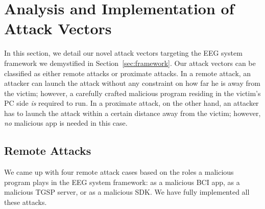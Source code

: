 \section{Analysis and Implementation of Attack Vectors}
\label{sec:attack}

In this section, we detail our novel attack vectors targeting the EEG system framework we demystified in Section~\ref{sec:framework}. Our attack vectors can be classified as either remote attacks or proximate attacks. In a remote attack, an attacker can launch the attack without any constraint on how far he is away from the victim; however, a carefully crafted malicious program residing in the victim's PC side \emph{is} required to run. In a proximate attack, on the other hand, an attacker has to launch the attack within a certain distance away from the victim; however, \emph{no} malicious app is needed in this case. %

\subsection{Remote Attacks}
We came up with four remote attack cases based on the roles a malicious program plays in the EEG system framework: as a malicious BCI app, as a malicious TGSP server, or as a malicious SDK. We have fully implemented all these attacks. 

